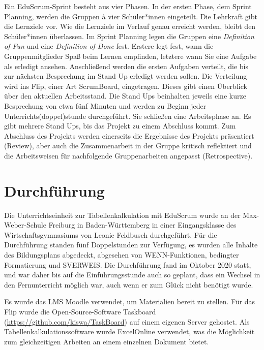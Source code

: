 \documentclass[twoside,twocolumn]{article}
\begin{document}
Ein EduScrum-Sprint besteht aus vier Phasen. In der ersten Phase, dem Sprint Planning, werden die Gruppen à vier Schüler*innen eingeteilt. Die Lehrkraft gibt die Lernziele vor. Wie die Lernziele im Verlauf genau erreicht werden, bleibt den Schüler*innen überlassen. Im Sprint Planning legen die Gruppen eine \textit{Definition of Fun} und eine \textit{Definition of Done} fest. Erstere legt fest, wann die Gruppenmitglieder Spaß beim Lernen empfinden, letztere wann Sie eine Aufgabe als erledigt ansehen. Anschließend werden die ersten Aufgaben verteilt, die bis zur nächsten Besprechung im Stand Up erledigt werden sollen. Die Verteilung wird ins Flip, einer Art ScrumBoard, eingetragen. Dieses gibt einen Überblick über den aktuellen Arbeitsstand. Die Stand Ups beinhalten jeweils eine kurze Besprechung von etwa fünf Minuten und werden zu Beginn jeder Unterrichts(doppel)stunde durchgeführt. Sie schließen eine Arbeitsphase an. Es gibt mehrere Stand Ups, bis das Projekt zu einem Abschluss kommt. Zum Abschluss des Projekts werden einerseits die Ergebnisse des Projekts präsentiert (Review), aber auch die Zusammenarbeit in der Gruppe kritisch reflektiert und die Arbeitsweisen für nachfolgende Gruppenarbeiten angepasst (Retrospective).


\section{Durchführung}

Die Unterrichtseinheit zur Tabellenkalkulation mit EduScrum wurde an der Max-Weber-Schule Freiburg in Baden-Württemberg in einer Eingangsklasse des Wirtschaftsgymnasiums von Leonie Feldbusch durchgeführt. Für die Durchführung standen fünf Doppelstunden zur Verfügung, es wurden alle Inhalte des Bildungsplans abgedeckt, abgesehen von WENN-Funktionen, bedingter Formatierung und SVERWEIS. Die Durchführung fand im Oktober 2020 statt, und war daher bis auf die Einführungsstunde auch so geplant, dass ein Wechsel in den Fernunterricht möglich war, auch wenn er zum Glück nicht benötigt wurde.

Es wurde das LMS Moodle verwendet, um Materialien bereit zu stellen. Für das Flip wurde die Open-Source-Software Taskboard (\url{https://github.com/kiswa/TaskBoard}) auf einem eigenen Server gehostet. Als Tabellenkalkulationssoftware wurde ExcelOnline verwendet, was die Möglichkeit zum gleichzeitigen Arbeiten an einem einzelnen Dokument bietet.
\end{document}
